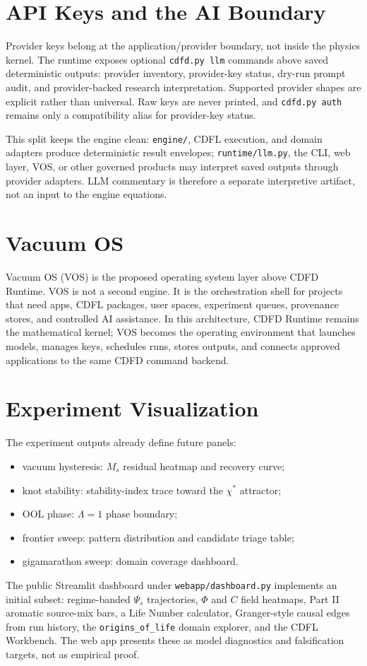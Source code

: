 \documentclass[12pt,a4paper]{article}
\begin{document}
\section{API Keys and the AI Boundary}
Provider keys belong at the application/provider boundary, not inside the
physics kernel. The runtime exposes optional \texttt{cdfd.py llm} commands
above saved deterministic outputs: provider inventory, provider-key status,
dry-run prompt audit, and provider-backed research interpretation. Supported
provider shapes are explicit rather than universal. Raw keys are never printed,
and \texttt{cdfd.py auth} remains only a compatibility alias for provider-key
status.

This split keeps the engine clean: \texttt{engine/}, CDFL execution, and domain
adapters produce deterministic result envelopes; \texttt{runtime/llm.py}, the
CLI, web layer, VOS, or other governed products may interpret saved outputs
through provider adapters. LLM commentary is therefore a separate interpretive
artifact, not an input to the engine equations.

\section{Vacuum OS}
Vacuum OS (VOS) is the proposed operating system layer above CDFD Runtime. VOS
is not a second engine. It is the orchestration shell for projects that need
apps, CDFL packages, user spaces, experiment queues, provenance stores, and
controlled AI assistance. In this architecture, CDFD Runtime remains the
mathematical kernel; VOS becomes the operating environment that launches models,
manages keys, schedules runs, stores outputs, and connects approved applications
to the same CDFD command backend.

\section{Experiment Visualization}
The experiment outputs already define future panels:
\begin{itemize}
    \item vacuum hysteresis: $M_s$ residual heatmap and recovery curve;
    \item knot stability: stability-index trace toward the $\chi^*$ attractor;
    \item OOL phase: $\Lambda=1$ phase boundary;
    \item frontier sweep: pattern distribution and candidate triage table;
    \item gigamarathon sweep: domain coverage dashboard.
\end{itemize}
The public Streamlit dashboard under \texttt{webapp/dashboard.py} implements an
initial subset: regime-banded $\Psi_s$ trajectories, $\Phi$ and $C$ field
heatmaps, Part II aromatic source-mix bars, a Life Number calculator,
Granger-style causal edges from run history, the \texttt{origins\_of\_life}
domain explorer, and the CDFL Workbench. The web app presents these as model
diagnostics and falsification targets, not as empirical proof.
\end{document}
